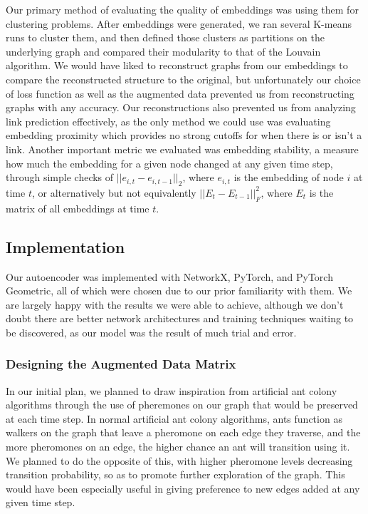 \documentclass[12pt,twoside]{report}
\begin{document}
Our primary method of evaluating the quality of embeddings was using them for clustering problems. After embeddings were generated, we ran several K-means runs to cluster them, and then defined those clusters as partitions on the underlying graph and compared their modularity to that of the Louvain algorithm. We would have liked to reconstruct graphs from our embeddings to compare the reconstructed structure to the original, but unfortunately our choice of loss function as well as the augmented data prevented us from reconstructing graphs with any accuracy. Our reconstructions also prevented us from analyzing link prediction effectively, as the only method we could use was evaluating embedding proximity which provides no strong cutoffs for when there is or isn't a link. Another important metric we evaluated was embedding stability, a measure how much the embedding for a given node changed at any given time step, through simple checks of $||e_{i,t} - e_{i,t-1}||_2$, where $e_{i,t}$ is the embedding of node $i$ at time $t$, or alternatively but not equivalently $||E_{t} - E_{t-1}||^2_F$, where $E_t$ is the matrix of all embeddings at time $t$. \\

\subsection{Implementation}

Our autoencoder was implemented with NetworkX, PyTorch, and PyTorch Geometric, all of which were chosen due to our prior familiarity with them. We are largely happy with the results we were able to achieve, although we don't doubt there are better network architectures and training techniques waiting to be discovered, as our model was the result of much trial and error. \\

\subsubsection{Designing the Augmented Data Matrix}

In our initial plan, we planned to draw inspiration from artificial ant colony algorithms \cite{bertelle2006organization, zhou2015ant} through the use of pheremones on our graph that would be preserved at each time step. In normal artificial ant colony algorithms, ants function as walkers on the graph that leave a pheromone on each edge they traverse, and the more pheromones on an edge, the higher chance an ant will transition using it. We planned to do the opposite of this, with higher pheromone levels decreasing transition probability, so as to promote further exploration of the graph. This would have been especially useful in giving preference to new edges added at any given time step. \\
\end{document}
